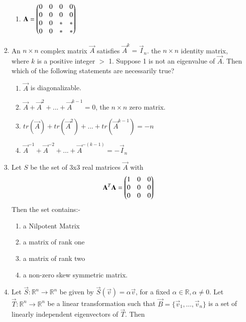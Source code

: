\begin{enumerate}[label=\thesection.\arabic*.,ref=\thesection.\theenumi]
\begin{enumerate}
    \item $\mathbf{A} = \begin{pmatrix}0 & 0 & 0 & 0 \\ 0 & 0 & 0 & 0 \\ 0 & 0 & * & * \\ 0 & 0 & * & *\end{pmatrix}$
\end{enumerate}
%
%
\solution

\item 	%
	An $n\times n$ complex matrix $\vec{A}$ satisfies $\vec{A}^{k} = \vec{I}_n$. the $n\times n$ identity matrix, where $k$ is a positive integer $>$ 1. Suppose 1 is not an eigenvalue of $\vec{A}$. Then which of the following statements are necessarily true?\\
	
	\begin{enumerate}
		\item $\vec{A}$ is diagonalizable. \\
		\item $\vec{A}+\Vec{A}^2+...+\vec{A}^{k-1} = 0$, the $n\times n$ zero matrix. \\
		\item $tr(\vec{A})+tr(\Vec{A}^2)+...+tr(\vec{A}^{k-1}) = -n$ \\
		\item $\vec{A}^{-1}+\Vec{A}^{-2}+...+\vec{A}^{-(k-1)} = -\vec{I}_n$
	\end{enumerate}
%
%
\solution

\item Let $S$ be the set of 3x3 real matrices $\vec{A}$ with 
\begin{align}
    \mathbf{A}^T\mathbf{A}=\begin{pmatrix}1&0&0\\0&0&0\\0&0&0\end{pmatrix}
\end{align}
Then the set contains:-\\
\begin{enumerate}
    \item a Nilpotent Matrix
    \item a matrix of rank one
    \item a matrix of rank two
    \item a non-zero skew symmetric matrix.
\end{enumerate}
%
%
\solution

\item Let $\vec{S}: \mathbb R^n \rightarrow \mathbb R^n$ be given by $\vec{S}(\vec{v}) = \alpha\vec{v}$, for a fixed $\alpha \in \mathbb R, \alpha \neq 0$. Let $\vec{T}: \mathbb R^n \rightarrow \mathbb R^n$ be a linear transformation such that $\vec{B} = \{ \vec{v}_1,\ldots,\vec{v}_n \}$ is a set of linearly independent eigenvectors of $\vec{T}$. Then

\end{enumerate}
